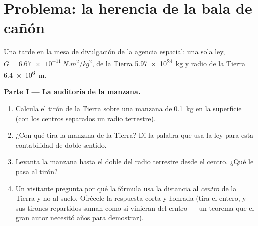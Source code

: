 \section{Problema: la herencia de la bala de cañón}

\begin{problem}\label{pb:g9:gravitation:1}
Una tarde en la mesa de divulgación de la agencia espacial: una sola
ley, $G = \qty{6.67e-11}{N.m^2/kg^2}$,  de la Tierra
\qty{5.97e24}{kg} y radio de la Tierra \qty{6.4e6}{m}.

\medskip\noindent\textbf{Parte I --- La auditoría de la manzana.}
\begin{enumerate}
  \item Calcula el tirón de la Tierra sobre una manzana de
        \qty{0.1}{kg} en la superficie (con los centros separados un
        radio terrestre).
  \item ¿Con qué  tira la manzana de la Tierra? Di la
        palabra que usa la ley para esta contabilidad de doble
        sentido.
  \item Levanta la manzana hasta el doble del radio terrestre desde
        el centro. ¿Qué le pasa al tirón?
  \item Un visitante pregunta por qué la fórmula usa la distancia al
        \emph{centro} de la Tierra y no al suelo. Ofrécele la
        respuesta corta y honrada (tira el  entero, y sus
        tirones repartidos suman como si vinieran del centro --- un
        teorema que el gran autor necesitó años para demostrar).
\end{enumerate}


\end{problem}
